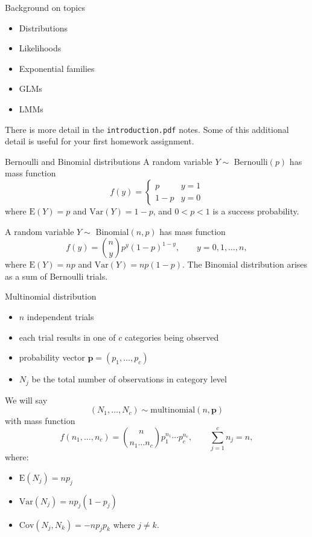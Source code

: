 \documentclass[
  ignorenonframetext,
]{beamer}
\providecommand{\tightlist}{%
  \setlength{\itemsep}{0pt}\setlength{\parskip}{0pt}}
\begin{document}
\begin{frame}{Background on topics}
\protect\hypertarget{background-on-topics}{}
\begin{itemize}
\tightlist
\item
  Distributions
\item
  Likelihoods
\item
  Exponential families
\item
  GLMs
\item
  LMMs
\end{itemize}

\vspace*{12pt}

There is more detail in the \texttt{introduction.pdf} notes. Some of
this additional detail is useful for your first homework assignment.
\end{frame}

\begin{frame}{Bernoulli and Binomial distributions}
\protect\hypertarget{bernoulli-and-binomial-distributions}{}
A random variable \(Y \sim\) Bernoulli\((p)\) has mass function \[
  f(y) = \left\{\begin{array}{cc}
    p   & y = 1 \\
    1-p & y = 0
  \end{array}\right.
\] where \(\text{E}(Y) = p\) and \(\text{Var}(Y) = 1 - p\), and
\(0 < p < 1\) is a success probability.

\vspace*{12pt}

A random variable \(Y \sim\) Binomial\((n,p)\) has mass function \[
  f(y) = {n \choose y}p^y(1-p)^{1-y}, \qquad y = 0,1,\ldots, n,
\] where \(\text{E}(Y) = np\) and \(\text{Var}(Y) = np(1-p)\). The
Binomial distribution arises as a sum of Bernoulli trials.
\end{frame}

\begin{frame}{Multinomial distribution}
\protect\hypertarget{multinomial-distribution}{}
\begin{itemize}
\tightlist
\item
  \(n\) independent trials
\item
  each trial results in one of \(c\) categories being observed
\item
  probability vector \(\mathbf{p}= (p_1,\ldots, p_c)\)
\item
  \(N_j\) be the total number of observations in category level
\end{itemize}

We will say \[
  (N_1,\ldots,N_c) \sim \text{multinomial}(n,\mathbf{p}) 
\] with mass function \[
  f(n_1,\ldots,n_c) = {n \choose n_1 \ldots n_c} p_1^{n_1}\cdots p_c^{n_c}, 
    \qquad \sum_{j=1}^c n_j = n,
\] where:

\begin{itemize}
\tightlist
\item
  \(\text{E}(N_j) = np_j\)
\item
  \(\text{Var}(N_j) = np_j(1-p_j)\)
\item
  \(\text{Cov}(N_j,N_k) = -np_jp_k\) where \(j \neq k\).
\end{itemize}
\end{frame}
\end{document}
